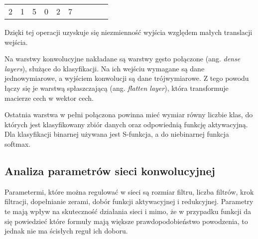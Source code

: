 \begin{table}[h]
\begin{tabular}{llllllllll}
\multicolumn{1}{|l|}{\cellcolor[HTML]{FFCB2F}2} & \multicolumn{1}{l|}{\cellcolor[HTML]{FFCB2F}1}  & \multicolumn{1}{l|}{\cellcolor[HTML]{FFCB2F}5} & \multicolumn{1}{l|}{\cellcolor[HTML]{32CB00}0} & \multicolumn{1}{l|}{\cellcolor[HTML]{32CB00}2} & \multicolumn{1}{l|}{\cellcolor[HTML]{32CB00}7} &  &                       &                                                 &                                                \\ \cline{1-6}
\end{tabular}
\end{table}

Dzięki tej operacji uzyskuje się niezmienność wyjścia względem małych translacji wejścia.

Na warstwy konwolucyjne nakładane są warstwy gęsto połączone (ang. \textit{dense layers}), służące do klasyfikacji. Na  ich wejściu wymagane są dane jednowymiarowe, a wyjściem konwolucji są dane trójwymiarowe. Z tego powodu łączy się je warstwą spłaszczającą (ang. \textit{flatten layer}), która transformuje macierze cech w wektor cech.

Ostatnia warstwa w pełni połączona powinna mieć wymiar równy liczbie klas, do których jest klasyfikowany zbiór danych oraz odpowiednią funkcję aktywacyjną. Dla klasyfikacji binarnej używana jest S-funkcja, a do niebinarnej funkcja softmax.

\subsection{Analiza parametrów sieci konwolucyjnej}

Parametermi, które można regulować w sieci są rozmiar filtru, liczba filtrów, krok filtracji, dopełnianie zerami, dobór funkcji aktywacyjnej i redukcyjnej. Parametry te mają wpływ na skuteczność działania sieci i mimo, że w przypadku funkcji da się powiedzieć które formuły mają większe prawdopodobieństwo powodzenia, to jednak nie ma ścisłych reguł ich doboru.

